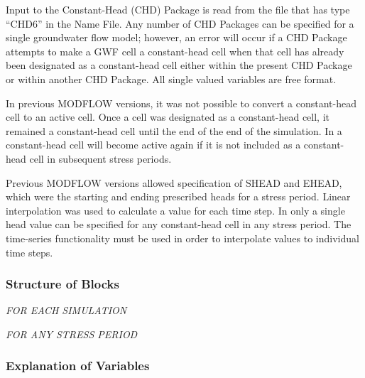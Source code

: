 
Input to the Constant-Head (CHD) Package is read from the file that has type ``CHD6'' in the Name File.  Any number of CHD Packages can be specified for a single groundwater flow model; however, an error will occur if a CHD Package attempts to make a GWF cell a constant-head cell when that cell has already been designated as a constant-head cell either within the present CHD Package or within another CHD Package.  All single valued variables are free format.  

In previous MODFLOW versions, it was not possible to convert a constant-head cell to an active cell.  Once a cell was designated as a constant-head cell, it remained a constant-head cell until the end of the end of the simulation.  In \mf a constant-head cell will become active again if it is not included as a constant-head cell in subsequent stress periods.

Previous MODFLOW versions allowed specification of SHEAD and EHEAD, which were the starting and ending prescribed heads for a stress period.  Linear interpolation was used to calculate a value for each time step.  In \mf only a single head value can be specified for any constant-head cell in any stress period.  The time-series functionality must be used in order to interpolate values to individual time steps.  

\vspace{5mm}
\subsubsection{Structure of Blocks}
\vspace{5mm}

\noindent \textit{FOR EACH SIMULATION}


\vspace{5mm}
\noindent \textit{FOR ANY STRESS PERIOD}


\vspace{5mm}
\subsubsection{Explanation of Variables}
\begin{description}

\end{description}

\vspace{5mm}
